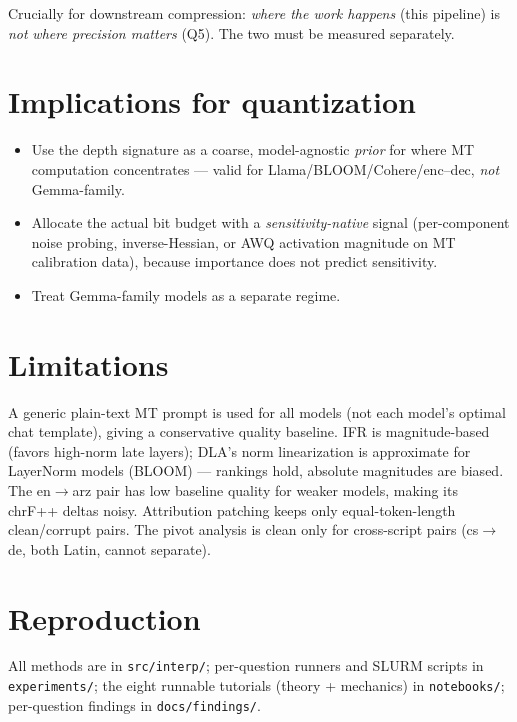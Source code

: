 \documentclass[11pt]{article}
\newcommand{\code}[1]{\texttt{\small #1}}
\begin{document}
Crucially for downstream compression: \emph{where the work happens} (this
pipeline) is \emph{not} \emph{where precision matters} (Q5). The two must be
measured separately.

\section{Implications for quantization}

\begin{itemize}\itemsep1pt
\item Use the depth signature as a coarse, model-agnostic \emph{prior} for
where MT computation concentrates --- valid for Llama/BLOOM/Cohere/enc--dec,
\emph{not} Gemma-family.
\item Allocate the actual bit budget with a \emph{sensitivity-native} signal
(per-component noise probing, inverse-Hessian, or AWQ activation magnitude on
MT calibration data), because importance does not predict sensitivity.
\item Treat Gemma-family models as a separate regime.
\end{itemize}

\section{Limitations}

A generic plain-text MT prompt is used for all models (not each model's
optimal chat template), giving a conservative quality baseline. IFR is
magnitude-based (favors high-norm late layers); DLA's norm linearization is
approximate for LayerNorm models (BLOOM) --- rankings hold, absolute
magnitudes are biased. The en$\rightarrow$arz pair has low baseline quality
for weaker models, making its chrF++ deltas noisy. Attribution patching keeps
only equal-token-length clean/corrupt pairs. The pivot analysis is clean only
for cross-script pairs (cs$\rightarrow$de, both Latin, cannot separate).

\section*{Reproduction}

All methods are in \code{src/interp/}; per-question runners and SLURM scripts
in \code{experiments/}; the eight runnable tutorials (theory + mechanics) in
\code{notebooks/}; per-question findings in \code{docs/findings/}.



\end{document}
